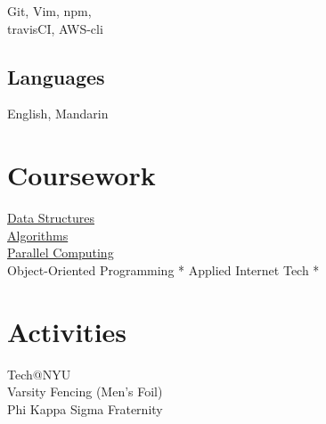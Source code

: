 \documentclass[]{hieudo-build}
\begin{document}
\begin{minipage}[t]{0.34\textwidth}
Git, Vim, npm,\\
travisCI, AWS-cli

\sectionsep

\subsection{Languages}
 English, Mandarin\\
\sectionsep

\section{Coursework}
\href{https://github.com/JasonYao/Fall2014NYU-DataStructures}{Data Structures}\\
\href{https://github.com/JasonYao/Algorithmic-Problem-Solving}{Algorithms}\\

\href{https://github.com/JasonYao?utf8=\%E2\%9C\%93\&tab=repositories\&q=parallel\&type=\&language=}{Parallel Computing}\\
Object-Oriented Programming *
Applied Internet Tech *

\sectionsep

\section{Activities}
Tech@NYU\\
Varsity Fencing (Men's Foil)\\
Phi Kappa Sigma Fraternity
\sectionsep


\sectionsep
{}

\end{minipage} 
\hfill
\end{document}
